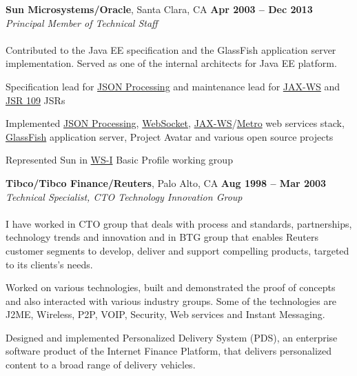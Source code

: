 \documentclass[margin,line]{resume}
\begin{document}
\begin{resume}
    \textbf{Sun Microsystems/Oracle}, Santa Clara, CA \hfill \textbf{Apr 2003 -- Dec 2013}\\ 
    \textsl{Principal Member of Technical Staff}\\\\
Contributed to the Java EE specification and the GlassFish application server implementation. Served as one of the internal architects for Java EE platform.
    \begin{list2}
    \item Specification lead for \href{http://jcp.org/en/jsr/detail?id=353}{JSON Processing} and maintenance lead for \href{http://jcp.org/en/jsr/detail?id=224}{JAX-WS} and \href{http://jcp.org/en/jsr/detail?id=109}{JSR 109} JSRs
    \item Implemented \href{https://javaee.github.io/jsonp/}{JSON Processing}, \href{https://github.com/tyrus-project/tyrus}{WebSocket}, \href{https://github.com/javaee/metro-jax-ws}{JAX-WS}/\href{https://javaee.github.io/metro/}{Metro} web services stack, \href{https://javaee.github.io/glassfish/}{GlassFish} application server, Project Avatar and various open source projects
    \item Represented Sun in \href{http://www.ws-i.org}{WS-I} Basic Profile working group
    \end{list2}\vspace{-1.5mm}


    \textbf{Tibco/Tibco Finance/Reuters}, Palo Alto, CA  \hfill \textbf{Aug 1998 -- Mar 2003}\\
    \textsl{Technical Specialist, CTO Technology Innovation Group}\\\\
I have worked in CTO group that deals with process and standards, partnerships, technology trends and innovation and in BTG group that enables Reuters customer segments to develop, deliver and support compelling products, targeted to its clients's needs.

    \begin{list2}
    \item Worked on various technologies, built and demonstrated the proof of concepts and also interacted with various industry groups. Some of the technologies are J2ME, Wireless, P2P, VOIP, Security, Web services and Instant Messaging.
    \item Designed and implemented Personalized Delivery System (PDS), an enterprise software product of the Internet Finance Platform, that delivers personalized content to a broad range of delivery vehicles. 
    \end{list2}\vspace{-1.5mm}


\end{resume}
\end{document}
